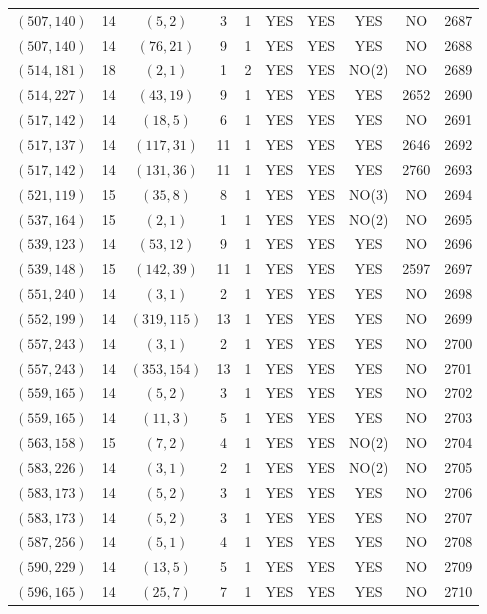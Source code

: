 \begin{longtable}{|c|c|c|c|c|c|c|c|c|c|}
$(507, 140)$ & 14 & $(5, 2)$ & 3 & 1 & YES & YES & YES & NO & 2687\\
$(507, 140)$ & 14 & $(76, 21)$ & 9 & 1 & YES & YES & YES & NO & 2688\\
$(514, 181)$ & 18 & $(2, 1)$ & 1 & 2 & YES & YES & NO(2) & NO & 2689\\
$(514, 227)$ & 14 & $(43, 19)$ & 9 & 1 & YES & YES & YES & 2652 & 2690\\
$(517, 142)$ & 14 & $(18, 5)$ & 6 & 1 & YES & YES & YES & NO & 2691\\
$(517, 137)$ & 14 & $(117, 31)$ & 11 & 1 & YES & YES & YES & 2646 & 2692\\
$(517, 142)$ & 14 & $(131, 36)$ & 11 & 1 & YES & YES & YES & 2760 & 2693\\
$(521, 119)$ & 15 & $(35, 8)$ & 8 & 1 & YES & YES & NO(3) & NO & 2694\\
$(537, 164)$ & 15 & $(2, 1)$ & 1 & 1 & YES & YES & NO(2) & NO & 2695\\
$(539, 123)$ & 14 & $(53, 12)$ & 9 & 1 & YES & YES & YES & NO & 2696\\
$(539, 148)$ & 15 & $(142, 39)$ & 11 & 1 & YES & YES & YES & 2597 & 2697\\
$(551, 240)$ & 14 & $(3, 1)$ & 2 & 1 & YES & YES & YES & NO & 2698\\
$(552, 199)$ & 14 & $(319, 115)$ & 13 & 1 & YES & YES & YES & NO & 2699\\
$(557, 243)$ & 14 & $(3, 1)$ & 2 & 1 & YES & YES & YES & NO & 2700\\
$(557, 243)$ & 14 & $(353, 154)$ & 13 & 1 & YES & YES & YES & NO & 2701\\
$(559, 165)$ & 14 & $(5, 2)$ & 3 & 1 & YES & YES & YES & NO & 2702\\
$(559, 165)$ & 14 & $(11, 3)$ & 5 & 1 & YES & YES & YES & NO & 2703\\
$(563, 158)$ & 15 & $(7, 2)$ & 4 & 1 & YES & YES & NO(2) & NO & 2704\\
$(583, 226)$ & 14 & $(3, 1)$ & 2 & 1 & YES & YES & NO(2) & NO & 2705\\
$(583, 173)$ & 14 & $(5, 2)$ & 3 & 1 & YES & YES & YES & NO & 2706\\
$(583, 173)$ & 14 & $(5, 2)$ & 3 & 1 & YES & YES & YES & NO & 2707\\
$(587, 256)$ & 14 & $(5, 1)$ & 4 & 1 & YES & YES & YES & NO & 2708\\
$(590, 229)$ & 14 & $(13, 5)$ & 5 & 1 & YES & YES & YES & NO & 2709\\
$(596, 165)$ & 14 & $(25, 7)$ & 7 & 1 & YES & YES & YES & NO & 2710\\

\end{longtable}
